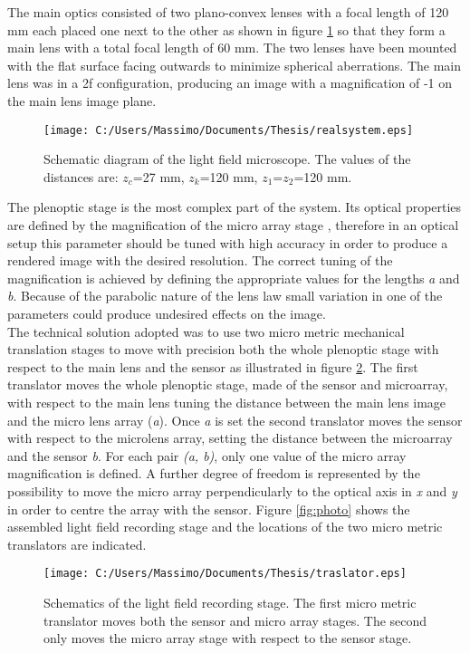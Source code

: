 The main optics consisted of two plano-convex lenses with a focal length of 120 mm each placed one next to the other as shown in figure \ref{fig:realsys} so that they form a main lens with a total focal length of 60 mm. The two lenses have been mounted with the flat surface facing outwards to minimize spherical aberrations. The main lens was in a 2f configuration, producing an image with a magnification of -1 on the main lens image plane. 
\newpage
\begin{figure}[H]
	\centering
	\texttt{[image: C:/Users/Massimo/Documents/Thesis/realsystem.eps]}
	\caption{\label{fig:realsys} Schematic diagram of the light field microscope. The values of the distances are: $z_c$=27 mm, $z_k$=120 mm, $z_1$=$z_2$=120 mm.
 }
\end{figure}
The plenoptic stage is the most complex part of the system. Its optical properties are defined by the magnification of the micro array stage \cite{turola2014wave,georgiev2010focused}, therefore in an optical setup this parameter should be tuned with high accuracy in order to produce a rendered image with the desired resolution. The correct tuning of the magnification is achieved by defining the appropriate values for the lengths \textit{a} and \textit{b}. Because of the parabolic nature of the lens law small variation in one of the parameters could produce undesired effects on the image.\\
The technical solution adopted was to use two micro metric mechanical translation stages to move with precision both the whole plenoptic stage with respect to the main lens and the sensor as illustrated in figure \ref{fig:traslator}. The first translator moves the whole plenoptic stage, made of the sensor and microarray, with respect to the main lens tuning the distance between the main lens image and the micro lens array (\textit{a}). Once \textit{a} is set the second translator moves the sensor with respect to the microlens array, setting the distance between the microarray and the sensor \textit{b}. For each pair \textit{(a, b)}, only one value of the micro array magnification is defined. A further degree of freedom is represented by the possibility to move the micro array perpendicularly to the optical axis in \textit{x} and \textit{y} in order to centre the array with the sensor.
Figure \ref{fig:photo} shows the assembled light field recording stage and the locations of the two micro metric translators are indicated.
\begin{figure}[H]
	\centering
	\texttt{[image: C:/Users/Massimo/Documents/Thesis/traslator.eps]}
	\caption{\label{fig:traslator} Schematics of the light field recording stage. The first micro metric translator moves both the sensor and micro array stages. The second only moves the micro array stage with respect to the sensor stage. }
\end{figure}
